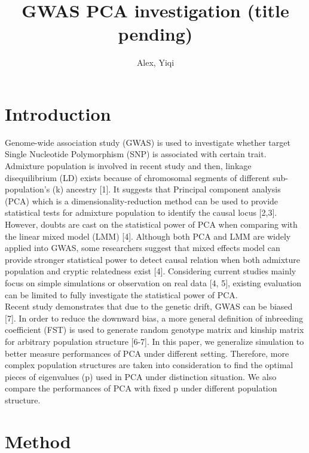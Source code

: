 \documentclass[12pt]{article}
\title{GWAS PCA investigation (title pending)}
\author{Alex, Yiqi }
\theoremstyle{definition}
\theoremstyle{plain}
\begin{document}
	\maketitle
	
	
\section{Introduction} 

Genome-wide association study (GWAS) is used to investigate whether target Single Nucleotide Polymorphism (SNP) is associated with certain trait. Admixture population is involved in recent study and then, linkage disequilibrium (LD) exists because of chromosomal segments of different sub-population's (k) ancestry [1]. It suggests that Principal component analysis (PCA) which is a dimensionality-reduction method can be used to provide statistical tests for admixture population to identify the causal locus [2,3]. However, doubts are cast on the statistical power of PCA when comparing with the linear mixed model (LMM) [4]. Although both PCA and LMM are widely applied into GWAS, some researchers suggest that mixed effects model can provide stronger statistical power to detect causal relation when both admixture population and cryptic relatedness exist [4]. Considering current studies mainly focus on simple simulations or observation on real data [4, 5], existing evaluation can be limited to fully investigate the statistical power of PCA. \\

Recent study demonstrates that due to the genetic drift, GWAS can be biased [7]. In order to reduce the downward bias, a more general definition of inbreeding coefficient (FST) is used to generate random genotype matrix and kinship matrix for arbitrary population structure [6-7]. In this paper, we generalize simulation to better measure performances of PCA under different setting. Therefore, more complex population structures are taken into consideration to find the optimal pieces of eigenvalues (p) used in PCA under distinction situation. We also compare the performances of PCA with fixed p under different population structure.

\section{Method} 
\end{document}
